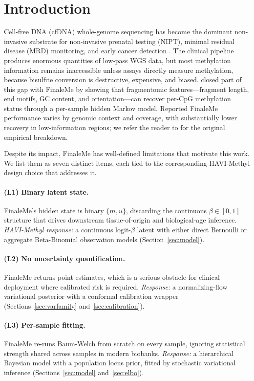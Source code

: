 \section{Introduction}
\label{sec:intro}

Cell-free DNA (cfDNA) whole-genome sequencing has become the dominant non-invasive substrate for non-invasive prenatal testing (NIPT), minimal residual disease (MRD) monitoring, and early cancer detection \citep{snyder2016,sun2015,moss2018,loyfer2023}. The clinical pipeline produces enormous quantities of low-pass WGS data, but most methylation information remains inaccessible unless assays directly measure methylation, because bisulfite conversion is destructive, expensive, and biased. \citet{liu2024finaleme} closed part of this gap with FinaleMe by showing that fragmentomic features---fragment length, end motifs, GC content, and orientation---can recover per-CpG methylation status through a per-sample hidden Markov model. Reported FinaleMe performance varies by genomic context and coverage, with substantially lower recovery in low-information regions; we refer the reader to \citet[Fig.~3]{liu2024finaleme} for the original empirical breakdown.

Despite its impact, FinaleMe has well-defined limitations that motivate this work. We list them as seven distinct items, each tied to the corresponding HAVI-Methyl design choice that addresses it.

\paragraph{(L1) Binary latent state.} FinaleMe's hidden state is binary $\{m,u\}$, discarding the continuous $\beta\in[0,1]$ structure that drives downstream tissue-of-origin and biological-age inference. \emph{HAVI-Methyl response:} a continuous logit-$\beta$ latent with either direct Bernoulli or aggregate Beta-Binomial observation models (Section~\ref{sec:model}).

\paragraph{(L2) No uncertainty quantification.} FinaleMe returns point estimates, which is a serious obstacle for clinical deployment where calibrated risk is required. \emph{Response:} a normalizing-flow variational posterior with a conformal calibration wrapper (Sections~\ref{sec:varfamily} and~\ref{sec:calibration}).

\paragraph{(L3) Per-sample fitting.} FinaleMe re-runs Baum-Welch from scratch on every sample, ignoring statistical strength shared across samples in modern biobanks. \emph{Response:} a hierarchical Bayesian model with a population locus prior, fitted by stochastic variational inference (Sections~\ref{sec:model} and~\ref{sec:elbo}).

